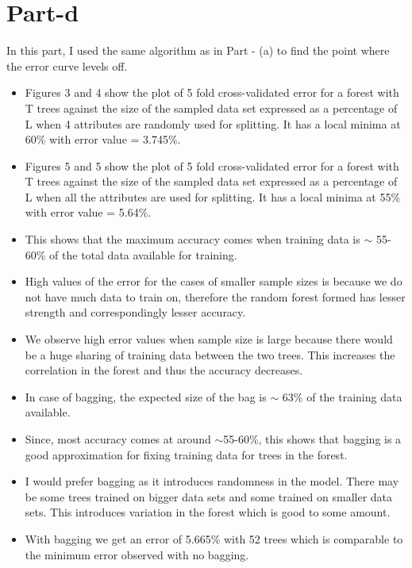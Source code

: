 \documentclass[12pt]{article}%
\begin{document}
\section{Part-d}
In this part, I used the same algorithm as in Part - (a) to find the point where the error curve levels off.
\begin{itemize}
\item Figures 3 and 4 show the plot of  5 fold cross-validated error for a forest with T trees against the size of the sampled data set expressed as a percentage of L when 4 attributes are randomly used for splitting. It has a local minima at 60\% with error value = 3.745\%.
\item Figures 5 and 5 show the plot of  5 fold cross-validated error for a forest with T trees against the size of the sampled data set expressed as a percentage of L when all the  attributes are used for splitting. It has a local minima at 55\% with error value = 5.64\%.
\item This shows that the maximum accuracy comes when training data is $\sim$ 55-60\% of the total data available for training.
\item High values of the error for the cases of smaller sample sizes is because we do not have much data to train on, therefore the random forest formed has lesser strength and correspondingly lesser accuracy. 
\item We observe high error values when sample size is large because there would be a huge sharing of training data between the two trees. This increases the correlation in the forest and thus the accuracy decreases.
\item  In case of bagging, the expected size of the bag is $\sim$ 63\% of the training data available.
\item  Since, most accuracy comes at around $\sim$55-60\%, this shows that bagging is a good approximation for fixing training data for trees in the forest. 
\item I would prefer bagging as it introduces randomness in the model. There may be some trees trained on bigger data sets and some trained on smaller data sets. This introduces variation in the forest which is good to some amount. 
\item With bagging we get an error of 5.665\% with 52 trees which is comparable to the minimum error observed with no bagging. 

\end{itemize}
\end{document}
